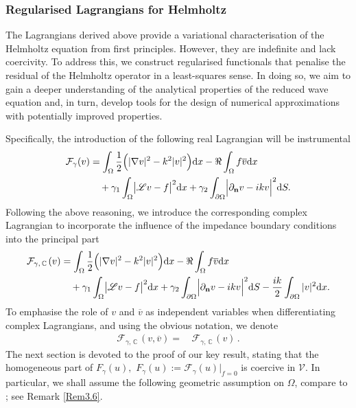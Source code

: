 \documentclass[twoside,11pt]{article}
\def\d{{\mathrm d}}
\def\C{{\mathbb C}}
\def\L{{\mathscr{L}}}
\def\vbar{\overline{v}}
\def\Vc{{\mathscr V}}
\def\L{{\mathscr{L}}}
\begin{document}
{\subsubsection*{Regularised Lagrangians for Helmholtz}

The Lagrangians derived above provide a variational characterisation of the Helmholtz equation from first principles. However, they are indefinite and lack coercivity. To address this, we construct regularised functionals that penalise the residual of the Helmholtz operator in a least-squares sense. In doing so, we aim to gain a deeper understanding of the analytical properties of the reduced wave equation and, in turn, develop tools for the design of numerical approximations with potentially improved properties.

Specifically, the introduction of the following real Lagrangian will be instrumental 
\begin{equation}
\begin{split}
\mathcal{F}_{\gamma} (v)
&= \int_{\Omega }  \frac12  \Bigl( |\nabla v |^2 - k^2|v|^2 \Bigr)  \d x
 -  {\Re \int_{\Omega } f  \overline{v}  \d  x} \\
&\quad + \gamma_1 \int_{\Omega} \bigl| \L v - f \bigr|^2   \d x
 +  \gamma_2 \int_{\partial \Omega} \Bigl| \partial_{\mathbf{n}} v - i k  v \Bigr|^2   \d S.
\end{split}
\end{equation}
Following the above reasoning, we introduce the corresponding complex Lagrangian to incorporate the influence of the impedance boundary conditions into the principal part
\begin{equation}\label{Complex-Energy_H_gamma_wbc}
\begin{split}
\mathcal{F}_{\gamma,\,  \C \, } (v)
&= \int_{\Omega }  \frac12  \Bigl( |\nabla v |^2 - k^2|v|^2 \Bigr)  \d x
 -  {\Re \int_{\Omega } f  \overline{v}  \d  x} \\
&\quad + \gamma_1 \int_{\Omega} \bigl| \L v - f \bigr|^2   \d x
 +  \gamma_2 \int_{\partial \Omega} \Bigl| \partial_{\mathbf{n}} v - i k  v \Bigr|^2   \d S - \frac{ik}{2}\int_{\partial \Omega}|v|^2 \d x .
\end{split}
\end{equation}
To emphasise the role of $v$ and $\vbar$ as independent variables when differentiating complex Lagrangians,   and using the obvious notation, we denote 
\begin{equation}\label{Complex-Energy_v_vbar}
\begin{split}
 \mathcal{F}_{\gamma,\,  \C \, } (v,  \overline{v}) = \,  &\mathcal{F}_{\gamma,\,  \C \, } (v)\, .
\end{split}\end{equation} 
The next section is devoted to the proof of our key result,  stating that the homogeneous part of   $F_\gamma(u), $ $F_\gamma(u):=\mathcal{F}_\gamma(u)\big|_{f=0}$ is coercive in $\Vc.$ In particular, we 
shall assume 
 the following geometric assumption on $\Omega$, compare to \cite{Moiola_Spence2014};  see Remark \ref{Rem3.6}.

}
\end{document}
